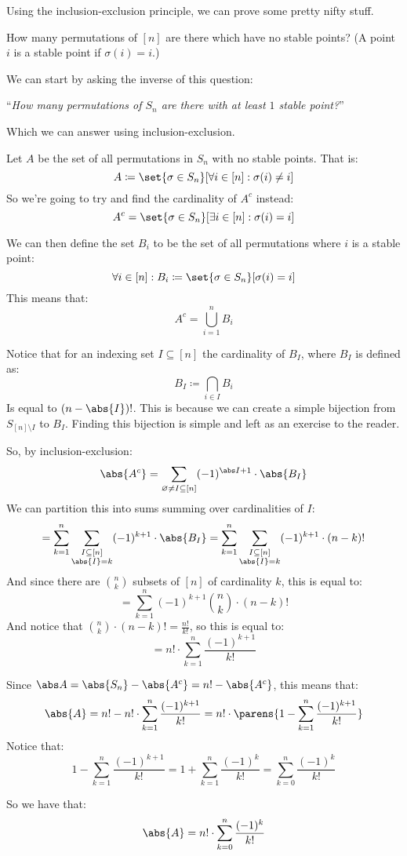 Using the inclusion-exclusion principle, we can prove some pretty nifty stuff.

\begin{exam}

	How many permutations of $[n]$ are there which have no stable points?
	(A point $i$ is a stable point if $\sigma(i)=i$.)

\end{exam}

\begin{blankpp}

	We can start by asking the inverse of this question:

	\hfill``\textsl{How many permutations of $S_n$ are there with at least $1$ stable point?}''

	Which we can answer using inclusion-exclusion.

	Let $A$ be the set of all permutations in $S_n$ with no stable points. That is:
	\[ A\coloneqq\set{\sigma\in S_n}[\forall i\in[n]: \sigma(i)\neq i] \]
	So we're going to try and find the cardinality of $A^c$ instead:
	\[ A^c=\set{\sigma\in S_n}[\exists i\in[n]: \sigma(i)=i] \]

	We can then define the set $B_i$ to be the set of all permutations where $i$ is a stable point:
	\[ \forall i\in[n]: B_i\coloneqq\set{\sigma\in S_n}[\sigma(i)=i] \]
	This means that:
	\[ A^c = \bigcup_{i=1}^n B_i \]

	Notice that for an indexing set $I\subseteq[n]$ the cardinality of $B_I$, where $B_I$ is defined as:
	\[ B_I\coloneqq\bigcap_{i\in I} B_i \]
	Is equal to $(n-\abs{I})!$.
	This is because we can create a simple bijection from $S_{[n]\setminus I}$ to $B_I$.
	Finding this bijection is simple and left as an exercise to the reader.
	
	So, by inclusion-exclusion:
	\[ \abs{A^c} = \sum_{\varnothing\neq I\subseteq[n]}(-1)^{\abs I+1}\cdot\abs{B_I} \]
	We can partition this into sums summing over cardinalities of $I$:
	\[ = \sum_{k=1}^n\sum_{\substack{I\subseteq[n]\\\abs{I}=k}}(-1)^{k+1}\cdot\abs{B_I}
	   = \sum_{k=1}^n\sum_{\substack{I\subseteq[n]\\\abs{I}=k}}(-1)^{k+1}\cdot(n-k)! \]
	And since there are $\binom nk$ subsets of $[n]$ of cardinality $k$, this is equal to:
	\[ = \sum_{k=1}^n(-1)^{k+1}\binom nk\cdot(n-k)! \]
	And notice that $\binom nk\cdot(n-k)! = \frac{n!}{k!}$, so this is equal to:
	\[ = n!\cdot\sum_{k=1}^n\frac{(-1)^{k+1}}{k!} \]

	Since $\abs A=\abs{S_n}-\abs{A^c}=n!-\abs{A^c}$, this means that:
	\[ \abs{A} = n! - n!\cdot\sum_{k=1}^n\frac{(-1)^{k+1}}{k!} = n!\cdot\parens{1-\sum_{k=1}^n\frac{(-1)^{k+1}}{k!}} \]
	Notice that:
	\[ 1-\sum_{k=1}^n\frac{(-1)^{k+1}}{k!} = 1+\sum_{k=1}^n\frac{(-1)^k}{k!} = \sum_{k=0}^n\frac{(-1)^k}{k!} \]

	So we have that:
	\[ \abs{A} = n!\cdot\sum_{k=0}^n\frac{(-1)^k}{k!} \]

\end{blankpp}

